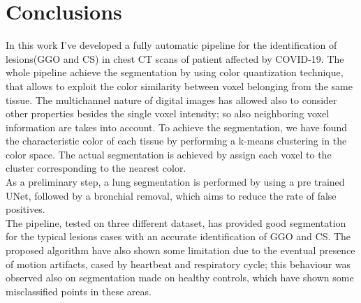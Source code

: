 \documentclass{standalone}
\begin{document}
\chapter*{Conclusions}

In this work I've developed a fully automatic pipeline for the identification of lesions(GGO and CS) in chest CT scans of patient affected by COVID-19.
The whole pipeline achieve the segmentation by using color quantization technique, that allows to exploit the color similarity between voxel belonging from the same tissue.  The multichannel nature of digital images has allowed also to consider other properties besides the single voxel intensity; so also neighboring voxel information are takes into account.\noindent
To achieve the segmentation, we have found the characteristic color of each tissue by performing a k-means clustering in the color space.  The actual segmentation is achieved by assign each voxel to the cluster corresponding to the nearest color.\\
As a preliminary step, a lung segmentation is performed by using a pre trained UNet, followed by a bronchial removal, which aims to reduce the rate of false positives.\\

\noindent The pipeline, tested on three different dataset, has provided good segmentation for the typical lesions cases with an accurate identification of GGO and CS. The proposed algorithm have also shown some limitation due to the eventual presence of motion artifacts, cased by heartbeat and respiratory cycle; this behaviour was observed also on segmentation made on healthy controls, which have shown some misclassified points in these areas.\\
\end{document}
